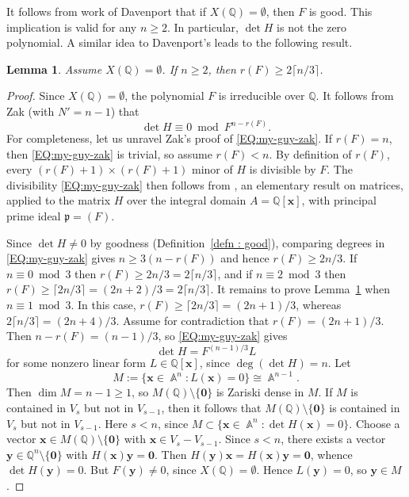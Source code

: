 \documentclass[a4paper,11pt, twoside,reqno]{amsart}
\theoremstyle{plain}
\newtheorem{lemma}[thm]{Lemma}
\theoremstyle{definition}
\theoremstyle{remark}
\newcommand{\bfx}{\bm{x}}
\newcommand{\bfy}{\bm{y}}
\newcommand{\QQ}{\mathbb{Q}}
\DeclareMathOperator{\A}{\mathbb{A}}
\renewcommand{\ge}{\geqslant}
\numberwithin{equation}{section}
\begin{document}
It follows from work of Davenport \cite{Dav63} that if $X(\QQ) = \emptyset$,
then $F$ is good.
This implication is valid for any $n\ge 2$.  In particular, $\det H$ is not the zero polynomial. 
A similar idea to Davenport's leads to the following result.

\begin{lemma}
\label{LEM:my-guy-slop}
Assume $X(\QQ)=\emptyset$.
If $n\ge 2$, then $r(F) \ge 2 \lceil n/3 \rceil$.
\end{lemma}

\begin{proof}
Since $X(\QQ)=\emptyset$, the polynomial $F$ is irreducible over $\QQ$.
It follows from Zak \cite[Proposition~4.2 and Corollary~4.4]{myguyzak} (with $N'=n-1$)
that
\begin{equation}
\label{EQ:my-guy-zak}
\det H \equiv 0\bmod{F^{n-r(F)}}.
\end{equation}
For completeness, let us unravel Zak's proof of \eqref{EQ:my-guy-zak}.
If $r(F)=n$, then \eqref{EQ:my-guy-zak} is trivial,
so assume $r(F)<n$.
By definition of $r(F)$,
every $(r(F)+1)\times(r(F)+1)$ minor of $H$
is divisible by $F$.
The divisibility \eqref{EQ:my-guy-zak} then
follows from \cite[Proposition~4.3]{myguyzak},
an elementary result on matrices,
applied to the matrix $H$
over the integral domain $A = \QQ[\bfx]$,
with principal prime ideal $\mathfrak p = (F)$.

Since $\det H \ne 0$ by goodness (Definition~\ref{defn : good}),
comparing degrees in \eqref{EQ:my-guy-zak}
gives $n \ge 3(n-r(F))$ and hence $r(F)\ge 2n/3$.
If $n\equiv 0\bmod{3}$ then $r(F) \ge 2n/3 = 2\lceil n/3\rceil$,
and if $n\equiv 2\bmod{3}$ then $r(F) \ge \lceil 2n/3 \rceil = (2n+2)/3 = 2\lceil n/3\rceil$.
It remains to prove Lemma~\ref{LEM:my-guy-slop} when $n\equiv 1\bmod{3}$.
In this case, $r(F) \ge \lceil 2n/3 \rceil = (2n+1)/3$,
whereas $2\lceil n/3\rceil = (2n+4)/3$.
Assume for contradiction that $r(F) = (2n+1)/3$.
Then $n-r(F) = (n-1)/3$, so \eqref{EQ:my-guy-zak} gives
\begin{equation*}
\det H = F^{(n-1)/3} L
\end{equation*}
for some nonzero linear form $L\in \QQ[\bfx]$,
since $\deg(\det H) = n$.
Let
\begin{equation*}
M := \{\bfx\in \A^n: L(\bfx)=0\}
\cong \A^{n-1}.
\end{equation*}
Then $\dim M = n-1 \ge 1$, so $M(\QQ) \setminus \{\bm0\}$ is Zariski dense in $M$.
If $M$ is contained in $V_s$ but not in $V_{s-1}$,
then it follows that $M(\QQ) \setminus \{\bm0\}$ is contained in $V_s$ but not in $V_{s-1}$.
Here $s<n$, since $M \subset \{\bfx\in \A^n: \det H(\bfx)=0\}$.
Choose a vector $\bfx\in M(\QQ) \setminus \{\bm0\}$ with $\bfx\in V_s - V_{s-1}$.
Since $s<n$, there exists
a vector $\bfy\in \QQ^n \setminus \{\bm0\}$ with $H(\bfx)\bfy=\bm0$.
Then $H(\bfy)\bfx = H(\bfx)\bfy = \bm0$, whence $\det H(\bfy) = 0$.
But $F(\bfy)\ne 0$, since $X(\QQ)=\emptyset$.
Hence $L(\bfy)=0$, so $\bfy\in M$.


\end{proof}
\end{document}
